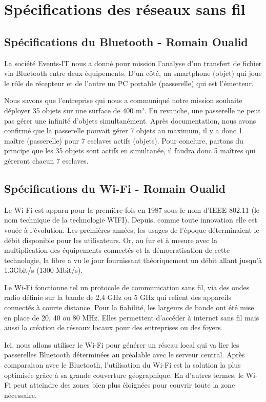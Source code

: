 \documentclass[12]{article}
\begin{document}
\section{Spécifications des réseaux sans fil}

\subsection{Spécifications du Bluetooth - Romain Oualid}

La société Events-IT nous a donné pour mission l'analyse d'un transfert de fichier via Bluetooth entre deux équipements. D'un côté, un smartphone (objet) qui joue le rôle de récepteur et de l'autre un PC portable (passerelle) qui est l'émetteur. 

Nous savons que l'entreprise qui nous a communiqué notre mission souhaite déployer 35 objets sur une surface de 400 m². En revanche, une passerelle ne peut pas gérer une infinité d'objets simultanément. Après documentation, nous avons confirmé que la passerelle pouvait gérer 7 objets au maximum, il y a donc 1 maître (passerelle) pour 7 esclaves actifs (objets). Pour conclure, partons du principe que les 35 objets sont actifs en simultanée, il faudra donc 5 maîtres qui géreront chacun 7 esclaves. 

\subsection{Spécifications du Wi-Fi - Romain Oualid}

Le Wi-Fi est apparu pour la première fois en 1987 sous le nom d'IEEE 802.11 (le nom technique de la technologie WIFI).
Depuis, comme toute innovation elle est vouée à l'évolution. Les premières années, les usages de l'époque déterminaient le débit disponible pour les utilisateurs. Or, au fur et à mesure avec la multiplication des équipements connectés et la démocratisation de cette technologie, la fibre a vu le jour fournissant théoriquement un débit allant jusqu'à 1.3Gbit/s (1300 Mbit/s). 

Le Wi-Fi fonctionne tel un protocole de communication sans fil, via des ondes radio définie sur la bande de 2,4 GHz ou 5 GHz qui relient des appareils connectés à courte distance. Pour la fiabilité, les largeurs de bande ont été mise en place de 20, 40 ou 80 MHz. Elles permettent d'accéder à internet sans fil mais aussi la création de réseaux locaux pour des entreprises ou des foyers. 

Ici, nous allons utiliser le Wi-Fi pour générer un réseau local qui va lier les passerelles Bluetooth déterminées au préalable avec le serveur central. Après comparaison avec le Bluetooth, l'utilisation du Wi-Fi est la solution la plus optimisée grâce à sa grande couverture géographique. En d'autres termes, le Wi-Fi peut atteindre des zones bien plus éloignées pour couvrir toute la zone nécessaire. 
\end{document}
